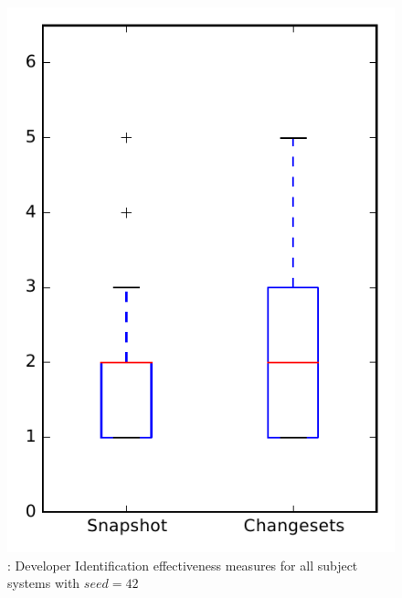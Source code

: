 
\begin{figure}
\centering
\includegraphics[height=0.4\textheight]{figures/dit_seed/rq1_overview_42}
\caption{\rtwo: Developer Identification effectiveness measures for all subject systems with $seed=42$}
\label{fig:dit_seed:rq1:overview}
\end{figure}
